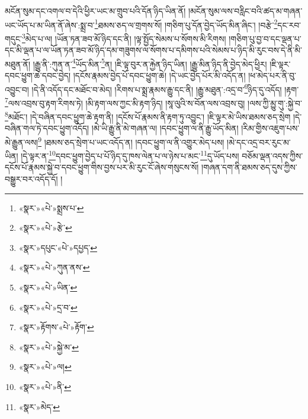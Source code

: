 མངོན་སུམ་དང་འགལ་བ་དེའི་ཕྱིར་ཡང་མ་གྲུབ་པའི་དོན་ཉིད་ཡིན་ནོ། །མངོན་སུམ་ལས་བརླིང་བའི་ཚད་མ་གཞན་ཡང་ཡོད་པ་མ་ཡིན་ནོ་ཞེས་:སྨྲ་བ་\footnote{«སྣར་»«པེ་»སྨྲས་པ་}ཐམས་ཅད་ལ་གྲགས་སོ། །གཅིག་པུ་དོན་བྱེད་ཡོད་མིན་ཞིང་། །བརྩེ་\footnote{«སྣར་»«པེ་»རྩེ་}དང་རབ་གདུང་\footnote{«སྣར་»དཔུང་«པེ་»དཔྱད་}མེད་པ་ལ། །ཡོན་ཏན་ཟབ་མོ་ཉིད་དང་ནི། །ལྟ་སྤྱོད་སེམས་པ་སོགས་མི་རིགས། །གཅིག་པུ་བྱ་བ་དང་ལྡན་པ་དང་མི་ལྡན་པ་ལ་ཡོན་ཏན་ཟབ་མོ་ཉིད་དམ་གཟུགས་ལ་སོགས་པ་དམིགས་པའི་སེམས་པ་ཉིད་མི་རུང་བས་དེ་ནི་མི་མཐུན་ནོ། །རྒྱུ་ནི་:ཀུན་ན་\footnote{«སྣར་»«པེ་»ཀུན་ནས་}ཡོད་མིན་\footnote{«སྣར་»«པེ་»ཡིན་}ན། །ཇི་ལྟ་བུར་ན་རྐྱེན་ཉིད་ཡིན། །རྒྱུ་མིན་ཉིད་ནི་བྱེད་མེད་ཕྱིར། །ཇི་ལྟར་དབང་ཕྱུག་ཆེ་དབང་བྱེད། །དངོས་རྣམས་བྱེད་པོ་དབང་ཕྱུག་ཆེ། །དེ་ཡང་བྱེད་པོར་མི་འདོད་ན། །ཕ་མེད་པར་ནི་བུ་འབྱུང་བ། །དེ་ནི་འདོད་དང་མཐོང་བ་མེད། །རིགས་པ་སྨྲ་རྣམས་རྒྱུ་དང་ནི། །རྒྱུ་མཐུན་:འདྲ་བ་\footnote{«སྣར་»«པེ་»དྲ་བ་}ཉིད་དུ་འདོད། །རྟག་\footnote{«སྣར་»རྟོགས་«པེ་»རྟོག་}ལས་འབྲས་བུ་རྟག་རིགས་ཏེ། །མི་རྟག་ལས་ཀྱང་མི་རྟག་ཉིད། །སཱ་ལུའི་ས་བོན་ལས་འབྲས་བུ། །ལས་ཀྱི་མྱུ་གུ་:སྐྱེ་བ་\footnote{«སྣར་»«པེ་»སྐྱེ་མ་}མཐོང་། །དེ་བཞིན་དབང་ཕྱུག་ཆེ་རྟག་ནི། །དངོས་པོ་རྣམས་ནི་རྟག་ཏུ་འབྱུང་། །ཇི་ལྟར་མེ་ཡིས་ཐམས་ཅད་སྲེག །དེ་བཞིན་གལ་ཏེ་དབང་ཕྱུག་འདོད། །མེ་ཡི་རྒྱུ་ནི་མེ་གཞན་ལ། །དབང་ཕྱུག་ལ་ནི་རྒྱུ་ཡོད་མིན། །རིམ་གྱིས་འཇུག་པས་མེ་རྒྱུན་ལས།\footnote{«སྣར་»«པེ་»ལ།} །ཐམས་ཅད་སྲེག་པ་ཡང་འདོད་ན། །དབང་ཕྱུག་ལ་ནི་འགྱུར་མེད་པས། །མེ་དང་འདྲ་བར་རུང་མ་ཡིན། །དེ་ལྟར་ན་\footnote{«སྣར་»«པེ་»ནི་}དབང་ཕྱུག་བྱེད་པ་པོ་ཉིད་དུ་ཁས་ལེན་པ་ལ་ཉེས་པ་མང་\footnote{«སྣར་»མེད་}དུ་ཡོད་པས། བཅོམ་ལྡན་འདས་ཀྱིས་དངོས་པོ་རྣམས་སྐྱེ་བ་དབང་ཕྱུག་གིས་བྱས་པར་མི་རུང་ངོ་ཞེས་གསུངས་སོ། །གཞན་དག་ནི་ཐམས་ཅད་དུས་ཀྱིས་བསྒྱུར་བར་འདོད་དོ། །
